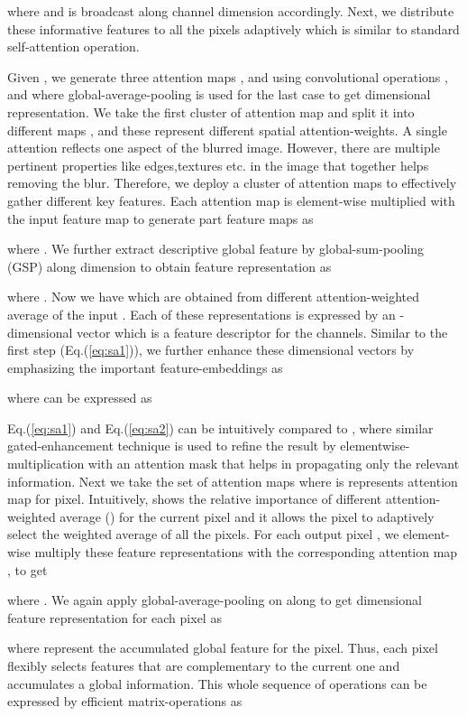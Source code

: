 \documentclass[10pt,twocolumn,letterpaper]{article}
\begin{document}
where  and  is broadcast along channel dimension accordingly. Next, we distribute these informative features to all the pixels adaptively which is similar to standard self-attention operation.

\par Given , we generate three attention maps  ,  and  using convolutional operations  , and  where global-average-pooling is used for the last case to get  dimensional representation.  We take the first cluster of attention map  and split it into  different maps ,  and these represent  different spatial attention-weights. A single attention reflects one aspect of the blurred image. However, there are multiple pertinent properties like edges,textures etc. in the image  that together helps removing the blur. Therefore, we deploy a cluster of attention maps to effectively gather  different key features. Each attention map is element-wise multiplied with the input feature map  to generate  part feature maps as

where . We further extract descriptive global feature by global-sum-pooling (GSP) along  dimension to obtain  feature representation as 

where . Now we have  which are obtained from  different attention-weighted average of the input . Each of these  representations is expressed by an -dimensional vector which is a feature descriptor for the  channels. Similar to the first step (Eq.(\ref{eq:sa1})), we further enhance these  dimensional vectors by emphasizing the important feature-embeddings as

where  can be expressed as

Eq.(\ref{eq:sa1}) and Eq.(\ref{eq:sa2}) can be intuitively compared to \cite{huang2019attention}, where similar gated-enhancement technique is used to refine the result by elementwise-multiplication with an attention mask that helps in propagating only the relevant information. Next we take the set of attention maps  where  is represents attention map for  pixel. Intuitively,  shows the relative importance of  different attention-weighted average () for the current pixel and it allows the pixel to adaptively select the weighted average of all the pixels. For each output pixel , we element-wise multiply these  feature representations  with the corresponding attention map , to get

where . We again apply global-average-pooling on  along  to get  dimensional feature representation for each pixel as

where  represent the accumulated global feature for the  pixel. Thus, each pixel flexibly selects features that are complementary to the current one and accumulates a global information.
This whole sequence of operations can be expressed by efficient matrix-operations as
\end{document}
